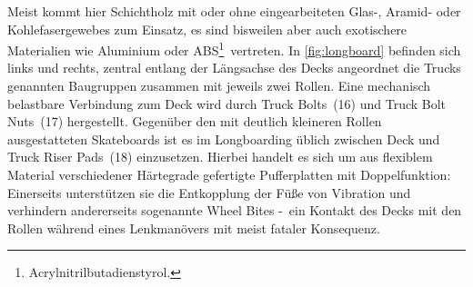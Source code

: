 		Meist kommt hier Schichtholz mit oder ohne eingearbeiteten Glas-, Aramid- oder Kohlefasergewebes zum Einsatz, es sind bisweilen aber auch exotischere Materialien wie Aluminium oder ABS\footnote{\hspace{1mm} Acrylnitrilbutadienstyrol.}~vertreten.
		In \cref{fig:longboard} befinden sich links und rechts, zentral entlang der Längsachse des Decks angeordnet die Trucks genannten Baugruppen zusammen mit jeweils zwei Rollen.
		Eine mechanisch belastbare Verbindung zum Deck wird durch Truck Bolts~(16) und Truck Bolt Nuts~(17) hergestellt.
		Gegenüber den mit deutlich kleineren Rollen ausgestatteten Skateboards ist es im Longboarding üblich zwischen Deck und Truck Riser Pads~(18) einzusetzen.
		Hierbei handelt es sich um aus flexiblem Material verschiedener Härtegrade gefertigte Pufferplatten mit Doppelfunktion:
		Einerseits unterstützen sie die Entkopplung der Füße von Vibration und verhindern andererseits sogenannte Wheel Bites -~ein Kontakt des Decks mit den Rollen während eines Lenkmanövers mit meist fataler Konsequenz.

